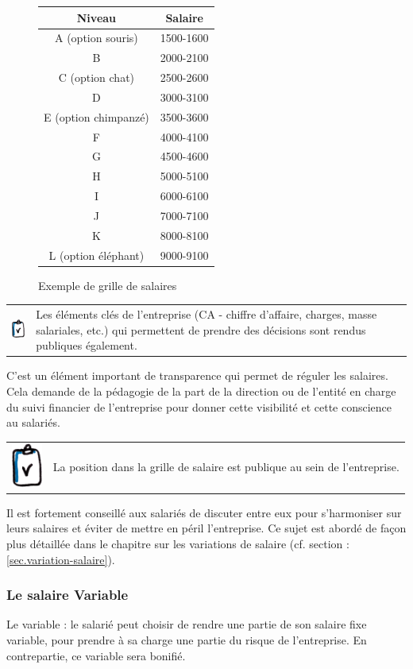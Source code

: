 \documentclass[12pt]{article}
\newcommand{\regle}[1]{%
  \begin{tcolorbox}[colframe=DarkOrange,boxrule=2pt,arc=4pt,left=6pt,right=6pt,top=6pt,bottom=6pt,boxsep=0pt,colback=LightOrange]
    \begin{tabular}{m{1.0cm} m{11.5cm}}
      \includegraphics[width=1.0cm]{includes/rules} & #1 \\
    \end{tabular}
  \end{tcolorbox}
}
\begin{document}
\begin{figure}
  \begin{center}
  \begin{tabular}{| c | c |}
    \hline
    Niveau & Salaire \\ 
    \hline
    A (option souris) & 1500-1600 \\
    \hline
    B & 2000-2100 \\
    \hline
    C (option chat) & 2500-2600 \\
    \hline
    D & 3000-3100 \\
    \hline
    E (option chimpanzé) & 3500-3600 \\
    \hline
    F & 4000-4100 \\
    \hline
    G & 4500-4600 \\
    \hline
    H & 5000-5100 \\
    \hline
    I & 6000-6100 \\
    \hline
    J & 7000-7100 \\
    \hline
    K & 8000-8100 \\
    \hline
    L (option éléphant) & 9000-9100 \\
    \hline
  \end{tabular}
  \end{center}
  \caption{Exemple de grille de salaires}
  \label{grille}
\end{figure}

\regle{Les éléments clés de l’entreprise (CA - chiffre d’affaire, charges, masse salariales, etc.) qui permettent de prendre des décisions sont rendus publiques également.}

 C’est un élément important de transparence qui permet de réguler les salaires. Cela demande de la pédagogie de la part de la direction ou de l’entité en charge du suivi financier de l’entreprise pour donner cette visibilité et cette conscience au salariés.

 \regle{La position dans la grille de salaire est publique au sein de l’entreprise.}

 Il est fortement conseillé aux salariés de discuter entre eux pour s’harmoniser sur leurs salaires et éviter de mettre en péril l’entreprise\cite{Gore}. Ce sujet est abordé de façon plus détaillée dans le chapitre sur les variations de salaire (cf. section : \ref{sec.variation-salaire}).

 \subsubsection{Le salaire Variable}
 Le variable : le salarié peut choisir de rendre une partie de son salaire fixe variable, pour prendre à sa charge une partie du risque de l’entreprise. En contrepartie, ce variable sera bonifié. 
\end{document}
